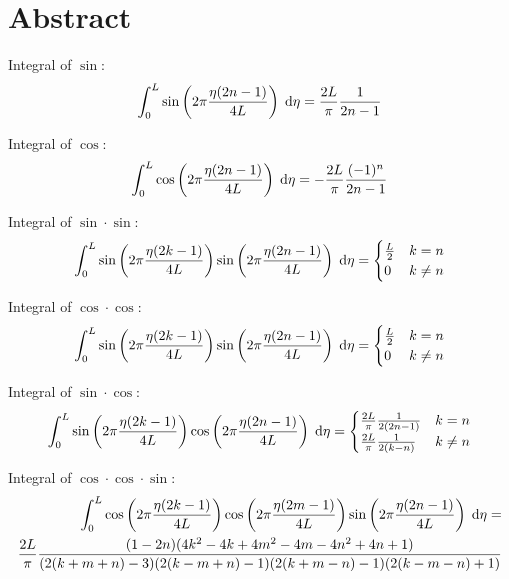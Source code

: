 \chapter*{Abstract}

Integral of $\sin$:
~
\begin{equation*}
    \int^L_0 \sin\left( 2 \pi \frac{\eta (2 n - 1)}{4 L} \right) \;\mathrm{d}\eta = 
    \frac{2 L}{\pi} \frac{1}{2n-1}
\end{equation*}

Integral of $\cos$:
~
\begin{equation*}
    \int^L_0 \cos\left( 2 \pi \frac{\eta (2 n - 1)}{4 L} \right) \;\mathrm{d}\eta = 
    - \frac{2 L}{\pi} \frac{(-1)^n}{2n-1}
\end{equation*}

Integral of $\sin \cdot \sin$:
~
\begin{equation*}
    \int^L_0 \sin\left( 2 \pi \frac{\eta (2 k - 1)}{4 L} \right) \sin\left( 2 \pi \frac{\eta (2 n - 1)}{4 L} \right) \;\mathrm{d}\eta = 
    \begin{cases}
        \frac{L}{2} & k = n \\
        0 & k \neq n
    \end{cases}
\end{equation*}

Integral of $\cos \cdot \cos$:
~
\begin{equation*}
    \int^L_0 \sin\left( 2 \pi \frac{\eta (2 k - 1)}{4 L} \right) \sin\left( 2 \pi \frac{\eta (2 n - 1)}{4 L} \right) \;\mathrm{d}\eta = 
    \begin{cases}
        \frac{L}{2} & k = n \\
        0 & k \neq n
    \end{cases}
\end{equation*}

Integral of $\sin \cdot \cos$:
~
\begin{equation*}
    \int^L_0 \sin\left( 2 \pi \frac{\eta (2 k - 1)}{4 L} \right) \cos\left( 2 \pi \frac{\eta (2 n - 1)}{4 L} \right) \;\mathrm{d}\eta = 
    \begin{cases}
        \frac{2 L}{\pi} \frac{1}{2(2n-1)} & k = n \\
        \frac{2 L}{\pi} \frac{1}{2(k-n)} & k \neq n
    \end{cases}
\end{equation*}

Integral of $\cos \cdot \cos \cdot \sin$:
~
\begin{equation*}
\begin{split}
    \int^L_0 \cos\left( 2 \pi \frac{\eta (2 k - 1)}{4 L} \right)
    \cos\left( 2 \pi \frac{\eta (2 m - 1)}{4 L} \right)
    \sin\left( 2 \pi \frac{\eta (2 n - 1)}{4 L} \right) \;\mathrm{d}\eta = \\
    \frac{2 L}{\pi}
    \frac{
    (1 - 2n)(4k^2 - 4k + 4m^2 - 4m - 4n^2 + 4n + 1)
    }{
    (2(k+m+n)-3)(2(k-m+n)-1)(2(k+m-n)-1)(2(k-m-n)+1)
    }
\end{split}
\end{equation*}
